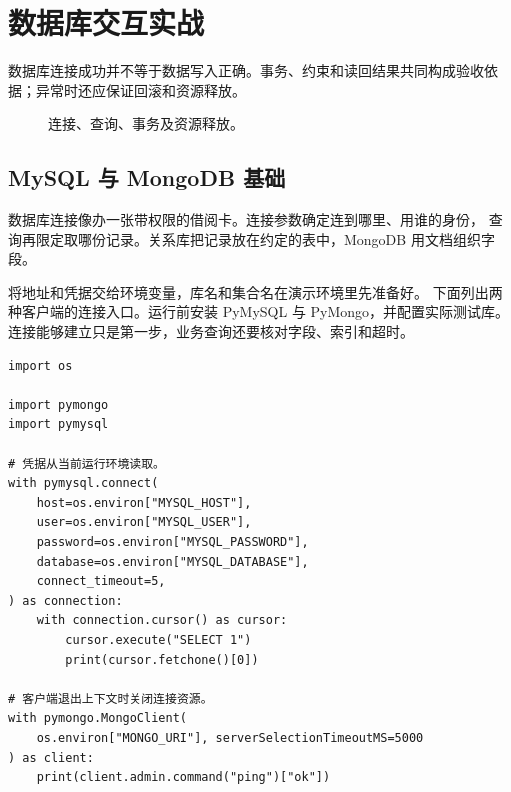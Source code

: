 \chapter{数据库交互实战}
\label{ch:14-outline}

数据库连接成功并不等于数据写入正确。事务、约束和读回结果共同构成验收依据；异常时还应保证回滚和资源释放。


\begin{figure}[htbp]
  \centering
  \caption*{连接、查询、事务及资源释放。}
\end{figure}


\section{MySQL 与 MongoDB 基础}

数据库连接像办一张带权限的借阅卡。连接参数确定连到哪里、用谁的身份，
查询再限定取哪份记录。关系库把记录放在约定的表中，MongoDB 用文档组织字段。

将地址和凭据交给环境变量，库名和集合名在演示环境里先准备好。
下面列出两种客户端的连接入口。运行前安装 PyMySQL 与 PyMongo，并配置实际测试库。
连接能够建立只是第一步，业务查询还要核对字段、索引和超时。


\begin{lstlisting}[title={\code{external_databases.py}}]
import os

import pymongo
import pymysql

# 凭据从当前运行环境读取。
with pymysql.connect(
    host=os.environ["MYSQL_HOST"],
    user=os.environ["MYSQL_USER"],
    password=os.environ["MYSQL_PASSWORD"],
    database=os.environ["MYSQL_DATABASE"],
    connect_timeout=5,
) as connection:
    with connection.cursor() as cursor:
        cursor.execute("SELECT 1")
        print(cursor.fetchone()[0])

# 客户端退出上下文时关闭连接资源。
with pymongo.MongoClient(
    os.environ["MONGO_URI"], serverSelectionTimeoutMS=5000
) as client:
    print(client.admin.command("ping")["ok"])
\end{lstlisting}

